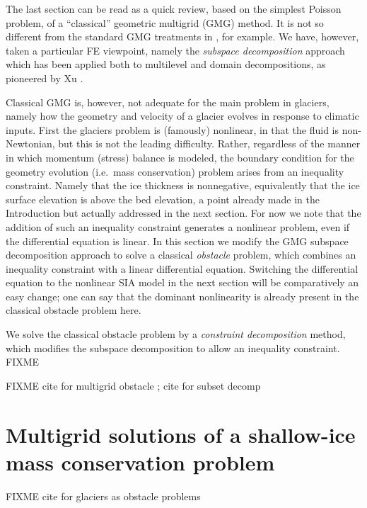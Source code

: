 \documentclass[letterpaper,final,12pt,reqno]{amsart}
\begin{document}
The last section can be read as a quick review, based on the simplest Poisson problem, of a ``classical'' geometric multigrid (GMG) method.  It is not so different from the standard GMG treatments in \cite{Briggsetal2000,Bueler2021,Trottenbergetal2001}, for example.  We have, however, taken a particular FE viewpoint, namely the \emph{subspace decomposition} approach which has been applied both to multilevel and domain decompositions, as pioneered by Xu \cite{Xu1992}.

Classical GMG is, however, not adequate for the main problem in glaciers, namely how the geometry and velocity of a glacier evolves in response to climatic inputs.  First the glaciers problem is (famously) nonlinear, in that the fluid is non-Newtonian, but this is not the leading difficulty.  Rather, regardless of the manner in which momentum (stress) balance is modeled, the boundary condition for the geometry evolution (i.e.~mass conservation) problem arises from an inequality constraint.  Namely that the ice thickness is nonnegative, equivalently that the ice surface elevation is above the bed elevation, a point already made in the Introduction but actually addressed in the next section.  For now we note that the addition of such an inequality constraint generates a nonlinear problem, even if the differential equation is linear.  In this section we modify the GMG subspace decomposition approach to solve a classical \emph{obstacle} problem, which combines an inequality constraint with a linear differential equation.  Switching the differential equation to the nonlinear SIA model in the next section will be comparatively an easy change; one can say that the dominant nonlinearity is already present in the classical obstacle problem here.

We solve the classical obstacle problem by a \emph{constraint decomposition} \cite{Tai2003} method, which modifies the subspace decomposition to allow an inequality constraint.  FIXME

FIXME cite for multigrid obstacle \cite{BrandtCryer1983,Bueler2021,GraeserKornhuber2009,Jouvetetal2013}; cite for subset decomp \cite{Tai2003}


\section{Multigrid solutions of a shallow-ice mass conservation problem} \label{sec:sia}

FIXME cite for glaciers as obstacle problems \cite{Bueler2016,Bueler2020,Calvoetal2002,JouvetBueler2012}
\end{document}
